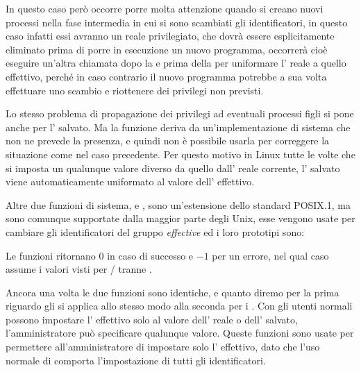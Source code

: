 In questo caso però occorre porre molta attenzione quando si creano nuovi
processi nella fase intermedia in cui si sono scambiati gli identificatori, in
questo caso infatti essi avranno un  reale privilegiato, che dovrà
essere esplicitamente eliminato prima di porre in esecuzione un nuovo
programma, occorrerà cioè eseguire un'altra chiamata dopo la  e
prima della  per uniformare l' reale a quello effettivo,
perché in caso contrario il nuovo programma potrebbe a sua volta effettuare
uno scambio e riottenere dei privilegi non previsti.

Lo stesso problema di propagazione dei privilegi ad eventuali processi figli
si pone anche per l' salvato. Ma la funzione  deriva
da un'implementazione di sistema che non ne prevede la presenza, e quindi non
è possibile usarla per correggere la situazione come nel caso precedente. Per
questo motivo in Linux tutte le volte che si imposta un qualunque valore
diverso da quello dall' reale corrente, l' salvato viene
automaticamente uniformato al valore dell' effettivo.

Altre due funzioni di sistema,  e , sono
un'estensione dello standard POSIX.1, ma sono comunque supportate dalla
maggior parte degli Unix, esse vengono usate per cambiare gli identificatori
del gruppo \textit{effective} ed i loro prototipi sono:

\begin{funcproto}{ 
}
{Le funzioni ritornano $0$ in caso di successo e $-1$ per un errore, nel qual
  caso  assume i valori visti per /
  tranne . 
}
\end{funcproto}

Ancora una volta le due funzioni sono identiche, e quanto diremo per la prima
riguardo gli  si applica allo stesso modo alla seconda per i
. Con  gli utenti normali possono impostare l'
effettivo solo al valore dell' reale o dell' salvato,
l'amministratore può specificare qualunque valore. Queste funzioni sono usate
per permettere all'amministratore di impostare solo l' effettivo,
dato che l'uso normale di  comporta l'impostazione di tutti gli
identificatori.
 
